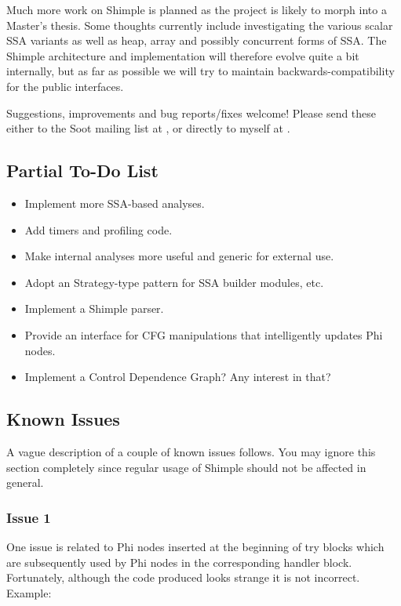 \documentclass[10pt,letterpaper,oneside,onecolumn]{article}
\begin{document}
Much more work on Shimple is planned as the project is likely to morph
into a Master's thesis.  Some thoughts currently include investigating
the various scalar SSA variants as well as heap, array and possibly
concurrent forms of SSA.  The Shimple architecture and implementation
will therefore evolve quite a bit internally, but as far as possible
we will try to maintain backwards-compatibility for the public
interfaces.

Suggestions, improvements and bug reports/fixes welcome!  Please send
these either to the Soot mailing list at
, or directly to myself
at
.

\subsection{Partial To-Do List}

\begin{itemize}
\item Implement more SSA-based analyses.
\item Add timers and profiling code.
\item Make internal analyses more useful and generic for external use.
\item Adopt an Strategy-type pattern for SSA builder modules, etc.
\item Implement a Shimple parser.
\item Provide an interface for CFG manipulations that intelligently 
updates Phi nodes.
\item Implement a Control Dependence Graph?  Any interest in that?
\end{itemize}

\subsection{Known Issues}

A vague description of a couple of known issues follows.  You may
ignore this section completely since regular usage of Shimple should
not be affected in general.

\subsubsection{Issue 1}

One issue is related to Phi nodes inserted at the beginning of try
blocks which are subsequently used by Phi nodes in the corresponding
handler block.  Fortunately, although the code produced looks strange
it is not incorrect.  Example:
\end{document}
